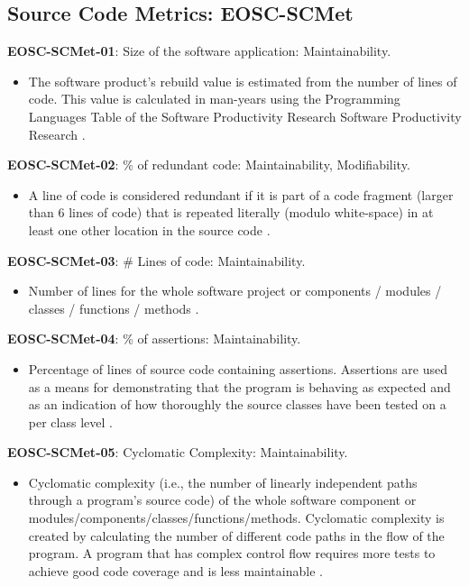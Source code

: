 \subsection{Source Code Metrics: EOSC-SCMet}

\textbf{EOSC-SCMet-01}: Size of the software application: Maintainability.

\begin{itemize}
    \item The software product's rebuild value is estimated from the number of lines of code. This value is calculated in man-years using the  Programming Languages Table of the Software Productivity Research Software Productivity Research \cite{baggen_standardized_2012}.
\end{itemize}

\textbf{EOSC-SCMet-02}: \% of redundant code: Maintainability, Modifiability.

\begin{itemize}
    \item A line of code is considered redundant if it is part of a code fragment (larger than 6 lines of code) that is repeated literally (modulo  white-space) in at least one other location in the source code \cite{baggen_standardized_2012}.
\end{itemize}

\textbf{EOSC-SCMet-03}: \# Lines of code: Maintainability.

\begin{itemize}
    \item Number of lines for the whole software project or components / modules / classes / functions / methods \cite{montagud_systematic_2012,baggen_standardized_2012}.
\end{itemize}

\textbf{EOSC-SCMet-04}: \% of assertions: Maintainability.

\begin{itemize}
    \item Percentage of lines of source code containing assertions. Assertions are used as a means for demonstrating that the program is behaving as expected and as an indication of how thoroughly the source classes have been tested on a per class level \cite{nagappan_early_2005}.
\end{itemize}

\textbf{EOSC-SCMet-05}: Cyclomatic Complexity: Maintainability.

\begin{itemize}
    \item Cyclomatic complexity (i.e.,  the number of linearly independent paths through a program's source code) of the whole software component or modules/components/classes/functions/methods. Cyclomatic complexity is created by calculating the number of different code paths in the flow of the program. A program that has complex control flow requires more tests to achieve good code coverage and is less maintainable \cite{srisopha_software_2018,montagud_systematic_2012,baggen_standardized_2012,nagappan_early_2005}.
\end{itemize}


